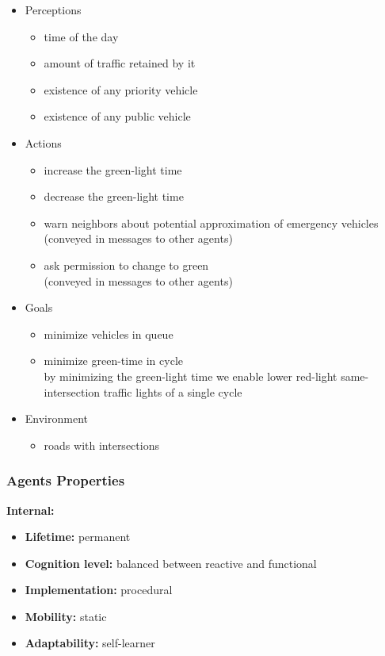 \documentclass[10pt,a4paper]{article}
\begin{document}
    \begin{itemize}
    \item Perceptions
        \begin{itemize}
        \item time of the day
        \item amount of traffic retained by it
        \item existence of any priority vehicle
        \item existence of any public vehicle
        \end{itemize}
        
    \item Actions
        \begin{itemize}
        \item increase the green-light time
        \item decrease the green-light time
        \item warn neighbors about potential approximation of emergency vehicles \\
        	(conveyed in messages to other agents)
        \item ask permission to change to green \\
        	(conveyed in messages to other agents)
        \end{itemize}
        
    \item Goals
        \begin{itemize}
        \item minimize vehicles in queue
        \item minimize green-time in cycle \\
        	by minimizing the green-light time we enable lower red-light same-intersection traffic lights of a single cycle
        \end{itemize}
        
    \item Environment
        \begin{itemize}
        \item roads with intersections
        \end{itemize}
    \end{itemize}

\subsubsection{Agents Properties}
    
    \textbf{Internal:}
    \begin{itemize}
    \item \textbf{Lifetime:} permanent
    \item \textbf{Cognition level:} balanced between reactive and functional
    \item \textbf{Implementation:} procedural
    \item \textbf{Mobility:} static
    \item \textbf{Adaptability:} self-learner 
    \end{itemize}
\end{document}
